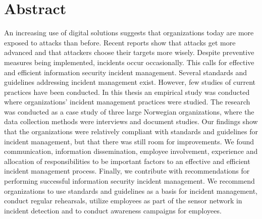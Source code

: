 \chapter*{Abstract}
An increasing use of digital solutions suggests that organizations today are more exposed to attacks than before. Recent reports show that attacks get more advanced and that attackers choose their targets more wisely. Despite preventive measures being implemented, incidents occur occasionally. This calls for effective and efficient information security incident management. Several standards and guidelines addressing incident management exist. However, few studies of current practices have been conducted. In this thesis an empirical study was conducted where organizations' incident management practices were studied. The research was conducted as a case study of three large Norwegian organizations, where the data collection methods were interviews and document studies. Our findings show that the organizations were relatively compliant with standards and guidelines for incident management, but that there was still room for improvements. We found communication, information dissemination, employee involvement, experience and allocation of responsibilities to be important factors to an effective and efficient incident management process. Finally, we contribute with recommendations for performing successful information security incident management. We recommend organizations to use standards and guidelines as a basis for incident management, conduct regular rehearsals, utilize employees as part of the sensor network in incident detection and to conduct awareness campaigns for employees.
